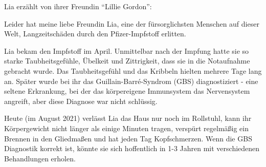 Lia erzählt von ihrer Freundin ``Lillie Gordon'':

Leider hat meine liebe Freundin Lia, eine der fürsorglichsten Menschen auf
dieser Welt, Langzeitschäden durch den Pfizer-Impfstoff erlitten.

Lia bekam den Impfstoff im April. Unmittelbar nach der Impfung hatte sie so
starke Taubheitsgefühle, Übelkeit und Zittrigkeit, dass sie in die Notaufnahme
gebracht wurde. Das Taubheitsgefühl und das Kribbeln hielten mehrere Tage lang
an. Später wurde bei ihr das Guillain-Barré-Syndrom (GBS) diagnostiziert - eine
seltene Erkrankung, bei der das körpereigene Immunsystem das Nervensystem
angreift, aber diese Diagnose war nicht schlüssig.

Heute (im August 2021) verlässt Lia das Haus nur noch im Rollstuhl, kann ihr
Körpergewicht nicht länger als einige Minuten tragen, verspürt regelmäßig ein
Brennen in den Gliedmaßen und hat jeden Tag Kopfschmerzen. Wenn die GBS
Diagnostik korrekt ist, könnte sie sich hoffentlich in 1-3 Jahren mit
verschiedenen Behandlungen erholen.
